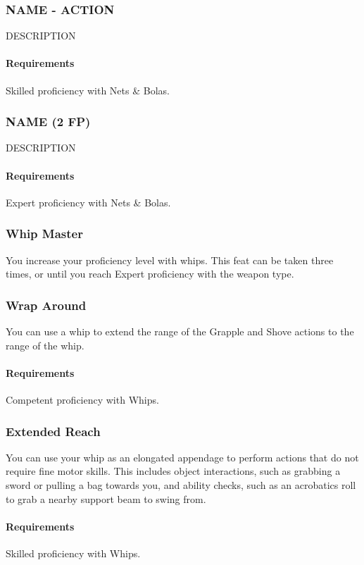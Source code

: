 \subsubsection{NAME - ACTION} \label{feat::name}
    DESCRIPTION
    \paragraph{Requirements} Skilled proficiency with Nets \& Bolas.
\subsubsection{NAME (2 FP)} \label{feat::name}
    DESCRIPTION
    \paragraph{Requirements} Expert proficiency with Nets \& Bolas.
\subsubsection{Whip Master} \label{feat::whipmaster}
    You increase your proficiency level with whips.
    This feat can be taken three times, or until you reach Expert proficiency with the weapon type.
\subsubsection{Wrap Around} \label{feat::wraparound}
    You can use a whip to extend the range of the Grapple and Shove actions to the range of the whip.
    \paragraph{Requirements} Competent proficiency with Whips.
\subsubsection{Extended Reach} \label{feat::extendedreach}
    You can use your whip as an elongated appendage to perform actions that do not require fine motor skills.
    This includes object interactions, such as grabbing a sword or pulling a bag towards you, and ability checks, such as an acrobatics roll to grab a nearby support beam to swing from.
    \paragraph{Requirements} Skilled proficiency with Whips.
